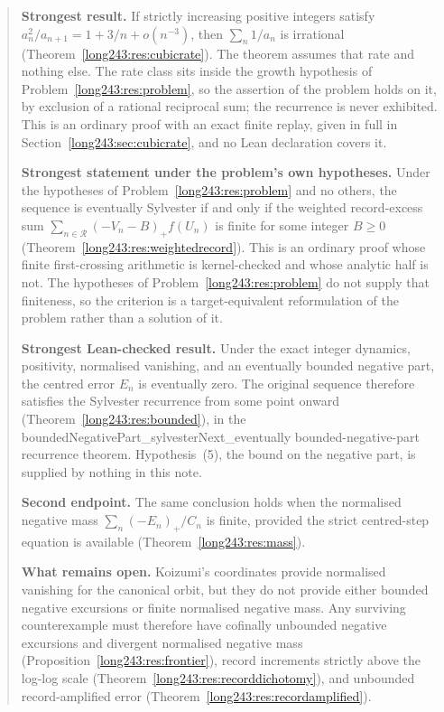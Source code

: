 \documentclass[11pt]{article}
\begin{document}
\begin{quote}\small
\textbf{Strongest result.}
If strictly increasing positive integers satisfy
$a_n^2/a_{n+1}=1+3/n+o(n^{-3})$, then $\sum_n1/a_n$ is irrational
(Theorem~\ref{long243:res:cubicrate}).  The theorem assumes that rate and nothing else.
The rate class sits inside the growth hypothesis of
Problem~\ref{long243:res:problem}, so the assertion of the problem holds on it, by
exclusion of a rational reciprocal sum; the recurrence is never exhibited.
This is an ordinary proof with an exact finite replay, given in full in
Section~\ref{long243:sec:cubicrate}, and no Lean declaration covers it.

\smallskip
\textbf{Strongest statement under the problem's own hypotheses.}
Under the hypotheses of Problem~\ref{long243:res:problem} and no others, the sequence
is eventually Sylvester if and only if the weighted record-excess sum
$\sum_{n\in\mathcal R}(-V_n-B)_+f(U_n)$ is finite for some integer $B\ge0$
(Theorem~\ref{long243:res:weightedrecord}).  This is an ordinary proof whose finite
first-crossing arithmetic is kernel-checked and whose analytic half is not.
The hypotheses of Problem~\ref{long243:res:problem} do not supply that finiteness, so
the criterion is a target-equivalent reformulation of the problem rather than a
solution of it.

\smallskip
\textbf{Strongest Lean-checked result.}
Under the exact integer dynamics, positivity, normalised vanishing, and an
eventually bounded negative part, the centred error $E_n$ is eventually zero.
The original sequence therefore satisfies the Sylvester recurrence from some
point onward (Theorem~\ref{long243:res:bounded}), in the
      {boundedNegativePart_sylvesterNext_eventually}
      {bounded-negative-part recurrence theorem}.  Hypothesis~(5), the bound on
the negative part, is supplied by nothing in this note.

\smallskip
\textbf{Second endpoint.}
The same conclusion holds when the normalised negative mass
$\sum_n(-E_n)_+/C_n$ is finite, provided the strict centred-step equation is
available (Theorem~\ref{long243:res:mass}).

\smallskip
\smallskip
\textbf{What remains open.}
Koizumi's coordinates provide normalised vanishing for the canonical orbit,
but they do not provide either bounded negative excursions or finite
normalised negative mass.  Any surviving counterexample must therefore have
cofinally unbounded negative excursions and divergent normalised negative
mass (Proposition~\ref{long243:res:frontier}), record increments strictly above the
log-log scale (Theorem~\ref{long243:res:recorddichotomy}), and unbounded
record-amplified error (Theorem~\ref{long243:res:recordamplified}).


\end{quote}
\end{document}
